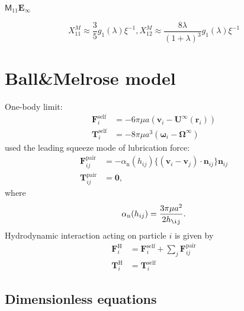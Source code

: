\documentclass[12pt]{article}
\newcommand{\tens}[1]{\bm{\mathsf{#1}}}
\begin{document}
$\tens{M}_{11} \bm{E}_{\infty}$

\begin{equation}
  X_{11}^{M}
\approx
\frac{3}{5} g_1(\lambda) \xi^{-1},
 X_{12}^{M}
\approx
\frac{8\lambda}{(1+\lambda)^3} g_1(\lambda) \xi^{-1}
\end{equation}




\newpage

\section{Ball\&Melrose model}

One-body limit:
\begin{align}
 \bm{F}_i^{\mathrm{self}} &= 
-6 \pi \mu a ( \bm{v}_i - \bm{U}^{\infty} (\bm{r}_i) ) \\
 \bm{T}_i^{\mathrm{self}} &= 
-8 \pi \mu a^3 ( \bm{\omega}_i - \bm{\Omega}^{\infty})
\end{align}
%
\citet{Melrose_2004a} used
the leading squeeze mode of lubrication force:
\begin{align}
 \bm{F}_{ij}^{\mathrm{pair}}
&=
- \alpha_{\mathrm{n}}(h_{ij})
\bigl\{
(\bm{v}_i - \bm{v}_j)
\cdot \bm{n}_{ij}
\bigr\}
\bm{n}_{ij} \\
 \bm{T}_{ij}^{\mathrm{pair}}
&=
\bm{0},
\end{align}
where
\begin{equation}
 \alpha_{\mathrm{n}}(h_{ij}) = 
\frac{3 \pi \mu a^2}{2 h_{\ij}}.
\end{equation}
Hydrodynamic interaction acting on particle $i$
is given by
\begin{align}
\bm{F}_i^{\mathrm{H}}
&=
\bm{F}_i^{\mathrm{self}}
+
\sum_j
\bm{F}_{ij}^{\mathrm{pair}} \\
\bm{T}_i^{\mathrm{H}}
&=
\bm{T}_i^{\mathrm{self}}
\end{align}


\subsection*{Dimensionless equations}
\end{document}
